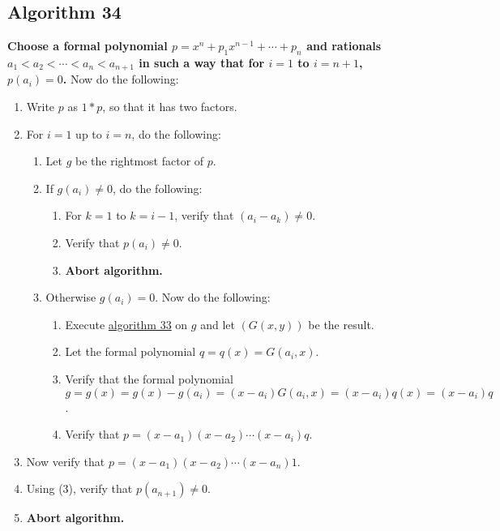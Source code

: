 \documentclass[twocolumn]{article}
\begin{document}
		\subsection{Algorithm 34}\label{sec:algorithm 34}
			\textbf{Choose a formal polynomial $p=x^n+p_1x^{n-1}+\cdots+p_n$ and rationals $a_1<a_2<\cdots<a_n<a_{n+1}$ in such a way that for $i=1$ to $i=n+1$, $p(a_i)=0$.} Now do the following:
			\begin{enumerate}
				\item Write $p$ as $1*p$, so that it has two factors.
				\item For $i=1$ up to $i=n$, do the following:
				\begin{enumerate}
					\item Let $g$ be the rightmost factor of $p$.
					\item If $g(a_i)\ne 0$, do the following:
					\begin{enumerate}
						\item For $k=1$ to $k=i-1$, verify that $(a_i-a_k)\ne 0$.
						\item Verify that $p(a_i)\ne 0$.
						\item \textbf{Abort algorithm.}
					\end{enumerate}
					\item Otherwise $g(a_i)=0$. Now do the following:
					\begin{enumerate}
						\item Execute \hyperref[sec:algorithm 33]{algorithm 33} on $g$ and let $(G(x,y))$ be the result.
						\item Let the formal polynomial $q=q(x)=G(a_i,x)$.
						\item Verify that the formal polynomial $g=g(x)=g(x)-g(a_i)=(x-a_i)G(a_i,x)=(x-a_i)q(x)=(x-a_i)q$.
						\item Verify that $p=(x-a_1)(x-a_2)\cdots(x-a_i)q$.
					\end{enumerate}
				\end{enumerate}
				\item Now verify that $p=(x-a_1)(x-a_2)\cdots(x-a_n)1$.
				\item Using (3), verify that $p(a_{n+1})\ne 0$.
				\item \textbf{Abort algorithm.}
			\end{enumerate}
\end{document}
